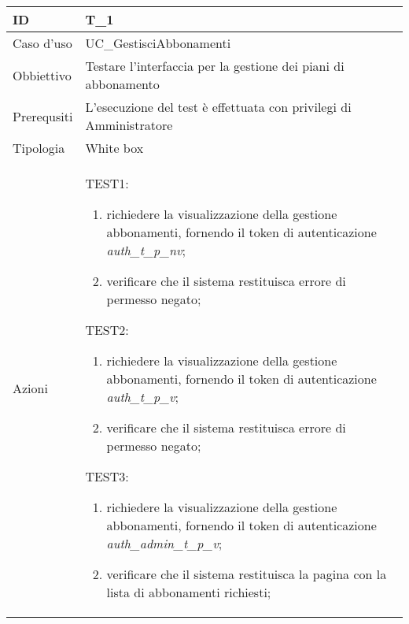 \begin{table}[hb]
    \centering
    \begin{tabular}{ |p{2cm}|p{10cm}|  }
        \hline
        ID          & T\_1                                                               \\\hline
        Caso d'uso  & UC\_GestisciAbbonamenti                                            \\\hline
        Obbiettivo  & Testare l'interfaccia per la gestione dei piani di abbonamento     \\\hline
        Prerequsiti & L'esecuzione del test è effettuata con privilegi di Amministratore \\\hline
        Tipologia   & White box                                                          \\\hline
        Azioni      &
        TEST1:
        \begin{enumerate}[nosep, topsep=0pt]
            \item richiedere la visualizzazione della gestione abbonamenti, fornendo il token di autenticazione \emph{auth\_t\_p\_nv};
            \item verificare che il sistema restituisca errore di permesso negato;
        \end{enumerate}
        \vspace{0.5cm} TEST2:
        \begin{enumerate}[nosep, topsep=0pt]
            \item richiedere la visualizzazione della gestione abbonamenti, fornendo il token di autenticazione \emph{auth\_t\_p\_v};
            \item verificare che il sistema restituisca errore di permesso negato;
        \end{enumerate}
        \vspace{0.5cm}TEST3:
        \begin{enumerate}[nosep, topsep=0pt]
            \item richiedere la visualizzazione della gestione abbonamenti, fornendo il token di autenticazione \emph{auth\_admin\_t\_p\_v};
            \item verificare che il sistema restituisca la pagina con la lista di abbonamenti richiesti;
        \end{enumerate}
        \\\hline
    \end{tabular}
\end{table}

